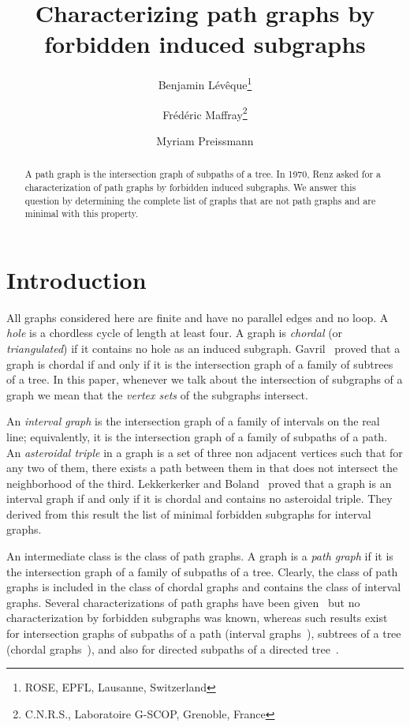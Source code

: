 \documentclass[11pt]{article}
\title{Characterizing path graphs by forbidden induced subgraphs}
\author{Benjamin L\'ev\^eque\thanks{ROSE, EPFL, Lausanne, Switzerland}
\and Fr\'ed\'eric Maffray\thanks{C.N.R.S., Laboratoire G-SCOP,
Grenoble, France} \and Myriam Preissmann}
\begin{document}
\maketitle

\begin{abstract}
A path graph is the intersection graph of subpaths of a tree.  In
1970, Renz asked for a characterization of path graphs by forbidden
induced subgraphs.  We answer this question by determining the
complete list of graphs that are not path graphs and are minimal with
this property.
\end{abstract}

\section{Introduction}

All graphs considered here are finite and have no parallel edges and
no loop.  A \emph{hole} is a chordless cycle of length at least four.
A graph is \emph{chordal} (or \emph{triangulated}) if it contains no
hole as an induced subgraph.  Gavril~\cite{Gav74} proved that a graph
is chordal if and only if it is the intersection graph of a family of
subtrees of a tree.  In this paper, whenever we talk about the
intersection of subgraphs of a graph we mean that the \emph{vertex
sets} of the subgraphs intersect.

An \emph{interval graph} is the intersection graph of a family of
intervals on the real line; equivalently, it is the intersection graph
of a family of subpaths of a path.  An \emph{asteroidal triple} in a
graph  is a set of three non adjacent vertices such that for any
two of them, there exists a path between them in  that does not
intersect the neighborhood of the third.  Lekkerkerker and
Boland~\cite{LB62} proved that a graph is an interval graph if and
only if it is chordal and contains no asteroidal triple.  They derived
from this result the list of minimal forbidden subgraphs for interval
graphs.

An intermediate class is the class of path graphs.  A graph is a
\emph{path graph} if it is the intersection graph of a family of
subpaths of a tree.  Clearly, the class of path graphs is included in
the class of chordal graphs and contains the class of interval graphs.
Several characterizations of path graphs have been
given~\cite{Gav78,MW86, Ren70} but no characterization by forbidden
subgraphs was known, whereas such results exist for intersection
graphs of subpaths of a path (interval graphs~\cite{LB62}), subtrees
of a tree (chordal graphs~\cite{Gav74}), and also for directed
subpaths of a directed tree~\cite{Pan99}.
\end{document}
